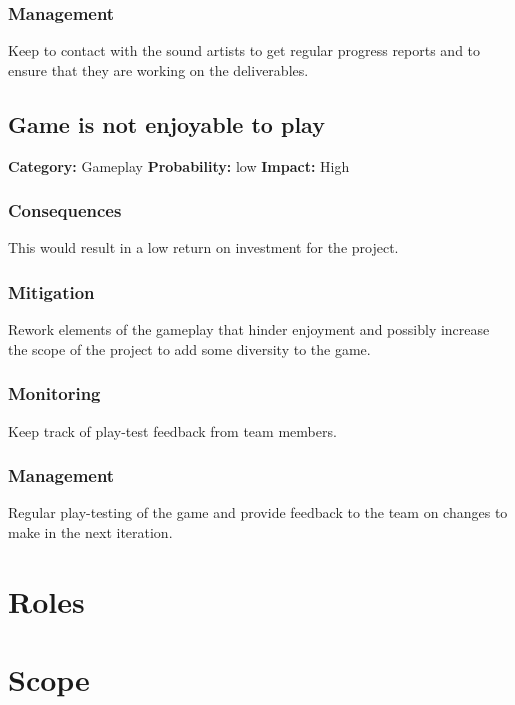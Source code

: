 \documentclass[a4paper,10pt]{article}
\begin{document}
\subsubsection*{Management}
Keep to contact with the sound artists to get regular progress reports and to ensure that they are working on the deliverables.

\subsection{Game is not enjoyable to play}
\textbf{Category:} Gameplay\newline
\textbf{Probability:} low\newline
\textbf{Impact:} High
\subsubsection*{Consequences}
This would result in a low return on investment for the project.
\subsubsection*{Mitigation}
Rework elements of the gameplay that hinder enjoyment and possibly increase the scope of the project to add some diversity to the game. 
\subsubsection*{Monitoring}
Keep track of play-test feedback from team members.
\subsubsection*{Management}
Regular play-testing of the game and provide feedback to the team on changes to make in the next iteration.
\section{Roles}

\section{Scope}
\end{document}
